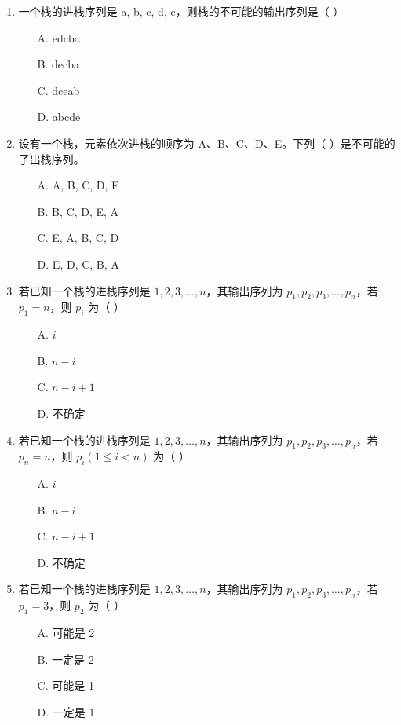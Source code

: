 \documentclass[12pt, a4paper]{article}
\begin{document}
\begin{enumerate}[label=\arabic*.]
	\item 一个栈的进栈序列是 a, b, c, d, e，则栈的不可能的输出序列是（ ）
	      \begin{enumerate}
		      \item[A.] edcba
		      \item[B.] decba
		      \item[C.] dceab
		      \item[D.] abcde
	      \end{enumerate}

	\item 设有一个栈，元素依次进栈的顺序为 A、B、C、D、E。下列（ ）是不可能的了出栈序列。
	      \begin{enumerate}
		      \item[A.] A, B, C, D, E
		      \item[B.] B, C, D, E, A
		      \item[C.] E, A, B, C, D
		      \item[D.] E, D, C, B, A
	      \end{enumerate}

	\item 若已知一个栈的进栈序列是 $1, 2, 3, \dots, n$，其输出序列为 $p_1, p_2, p_3, \dots, p_n$，若 $p_1=n$，则 $p_i$ 为（ ）
	      \begin{enumerate}
		      \item[A.] $i$
		      \item[B.] $n-i$
		      \item[C.] $n-i+1$
		      \item[D.] 不确定
	      \end{enumerate}

	\item 若已知一个栈的进栈序列是 $1, 2, 3, \dots, n$，其输出序列为 $p_1, p_2, p_3, \dots, p_n$，若 $p_n=n$，则 $p_i (1 \le i < n)$ 为（ ）
	      \begin{enumerate}
		      \item[A.] $i$
		      \item[B.] $n-i$
		      \item[C.] $n-i+1$
		      \item[D.] 不确定
	      \end{enumerate}

	\item 若已知一个栈的进栈序列是 $1, 2, 3, \dots, n$，其输出序列为 $p_1, p_2, p_3, \dots, p_n$，若 $p_1=3$，则 $p_2$ 为（ ）
	      \begin{enumerate}
		      \item[A.] 可能是 2
		      \item[B.] 一定是 2
		      \item[C.] 可能是 1
		      \item[D.] 一定是 1
	      \end{enumerate}


\end{enumerate}
\end{document}
